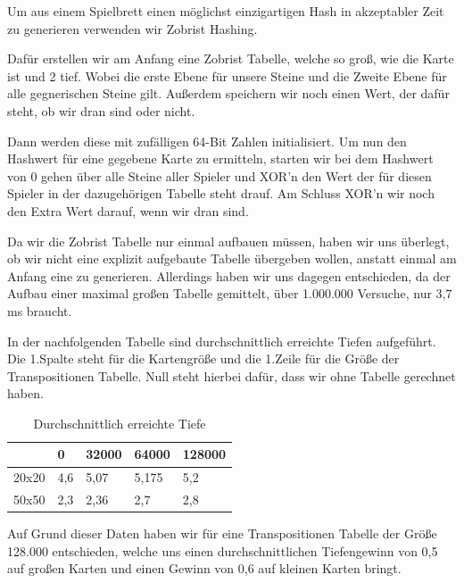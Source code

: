 \documentclass[12pt,a4paper,bibliography=totocnumbered,listof=totocnumbered]{article}
\begin{document}
Um aus einem Spielbrett einen möglichst einzigartigen Hash in akzeptabler Zeit zu generieren verwenden wir Zobrist Hashing.

Dafür erstellen wir am Anfang eine Zobrist Tabelle, welche so groß, wie die Karte ist und 2 tief. Wobei die erste Ebene für unsere Steine und die Zweite Ebene für alle gegnerischen Steine gilt. Außerdem speichern wir noch einen Wert, der dafür steht, ob wir dran sind oder nicht.

Dann werden diese mit zufälligen 64-Bit Zahlen initialisiert.
Um nun den Hashwert für eine gegebene Karte zu ermitteln, starten wir bei dem Hashwert von 0 gehen über alle Steine aller Spieler und XOR'n den Wert der für diesen Spieler in der dazugehörigen Tabelle steht drauf. Am Schluss XOR'n wir noch den Extra Wert darauf, wenn wir dran sind.

Da wir die Zobrist Tabelle nur einmal aufbauen müssen, haben wir uns überlegt, ob wir nicht eine explizit aufgebaute Tabelle übergeben wollen, anstatt einmal am Anfang eine zu generieren.
Allerdings haben wir uns dagegen entschieden, da der Aufbau einer maximal großen Tabelle gemittelt, über 1.000.000 Versuche, nur 3,7 ms braucht.

In der nachfolgenden Tabelle sind durchschnittlich erreichte Tiefen aufgeführt. Die 1.Spalte steht für die Kartengröße und die 1.Zeile für die Größe der Transpositionen Tabelle. Null steht hierbei dafür, dass wir ohne Tabelle gerechnet haben.

\begin{table}[!h]
\centering
	\begin{tabular} {| m{1.7cm} | m{3cm} | m{3cm} | m{3cm} | m{3cm}|}
		\hline
		\textbf{} &\textbf{0} &\textbf{32000} & \textbf{64000} & \textbf{128000}\\
		\hline
		20x20 & 4,6 & 5,07 & 5,175 & 5,2 \\
		\hline
		50x50 & 2,3 & 2,36 & 2,7 & 2,8 \\
		\hline
	\end{tabular}
	\caption{Durchschnittlich erreichte Tiefe}
	\label{tab:tasks}
\end{table}

Auf Grund dieser Daten haben wir für eine Transpositionen Tabelle der Größe 128.000 entschieden, welche uns einen durchschnittlichen Tiefengewinn von 0,5 auf großen Karten und einen Gewinn von 0,6 auf kleinen Karten bringt.



\newpage
\end{document}
